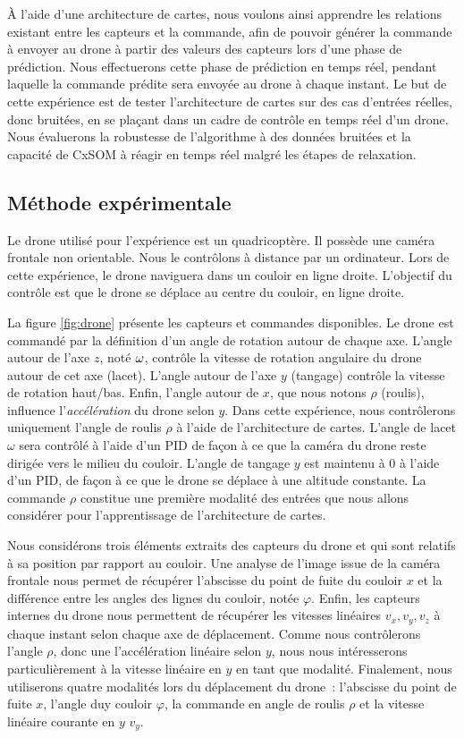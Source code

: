 \documentclass[../main]{subfiles}
\begin{document}
\`A l'aide d'une architecture de cartes, nous voulons ainsi apprendre les relations existant entre les capteurs et la commande, afin de pouvoir générer la commande à envoyer au drone à partir des valeurs des capteurs lors d'une phase de prédiction.
Nous effectuerons cette phase de prédiction en temps réel, pendant laquelle la commande prédite sera envoyée au drone à chaque instant.
Le but de cette expérience est de tester l'architecture de cartes sur des cas d'entrées réelles, donc bruitées, en se plaçant dans un cadre de contrôle en temps réel d'un drone.
Nous évaluerons la robustesse de l'algorithme à des données bruitées et la capacité de CxSOM à réagir en temps réel malgré les étapes de relaxation.

\subsection{Méthode expérimentale}

Le drone utilisé pour l'expérience est un quadricoptère. Il possède une caméra frontale non orientable.
Nous le contrôlons à distance par un ordinateur.  Lors de cette expérience, le drone naviguera dans un couloir en ligne droite. L'objectif du contrôle est que le drone se déplace au centre du couloir, en ligne droite.


La figure \ref{fig:drone} présente les capteurs et commandes disponibles.
Le drone est commandé par la définition d'un angle de rotation autour de chaque axe. 
L'angle autour de l'axe $z$, noté $\omega$, contrôle la vitesse de rotation angulaire du drone autour de cet axe (lacet).
L'angle autour de l'axe $y$ (tangage) contrôle la vitesse de rotation haut/bas. Enfin, l'angle autour de $x$, que nous notons $\rho$ (roulis), influence l'\emph{accélération} du drone selon $y$. Dans cette expérience, nous contrôlerons uniquement l'angle de roulis $\rho$ à l'aide de l'architecture de cartes.
L'angle de lacet $\omega$ sera contrôlé à l'aide d'un PID de façon à ce que la caméra du drone reste dirigée vers le milieu du couloir. L'angle de tangage $y$ est maintenu à 0 à l'aide d'un PID, de façon à ce que le drone se déplace à une altitude constante.
La commande $\rho$ constitue une première modalité des entrées que nous allons considérer pour l'apprentissage de l'architecture de cartes.

Nous considérons trois éléments extraits des capteurs du drone et qui sont relatifs à sa position par rapport au couloir. Une analyse de l'image issue de la caméra frontale nous permet de récupérer l'abscisse du point de fuite du couloir $x$ et la différence entre les angles des lignes du couloir, notée $\varphi$.
Enfin, les capteurs internes du drone nous permettent de récupérer les vitesses linéaires $v_x,v_y,v_z$ à chaque instant selon chaque axe de déplacement. 
Comme nous contrôlerons l'angle $\rho$, donc une l'accélération linéaire selon $y$, nous nous intéresserons particulièrement à la vitesse linéaire en $y$ en tant que modalité.
Finalement, nous utiliserons quatre modalités lors du déplacement du drone~: l'abscisse du point de fuite $x$, l'angle duy couloir $\varphi$, la commande en angle de roulis $\rho$ et la vitesse linéaire courante en $y$ $v_y$.
\end{document}
